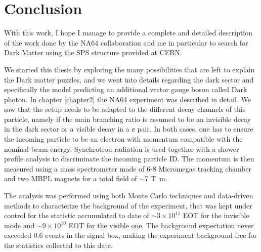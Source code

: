 
\chapter{Conclusion} %

\label{chapter6}

With this work, I hope I manage to provide a complete and detailed description of the work done by the NA64 collaboration and me in particular to search for Dark Matter using the SPS structure provided at CERN.

We started this thesis by exploring the many possibilities that are left to explain the Dark matter puzzles, and we went into details regarding the dark sector and specifically the model predicting an additional vector gauge boson called Dark photon. In chapter \ref{chapter2} the NA64 experiment was described in detail. We saw that the setup needs to be adapted to the different decay channels of this particle, namely if the main branching ratio is assumed to be an invisible decay in the dark sector or a visible decay in a $\ee$ pair. In both cases, one has to ensure the incoming particle to be an electron with momentum compatible with the nominal beam energy. Synchrotron radiation is used together with a shower profile analysis to discriminate the incoming particle ID. The momentum is then measured using a mass spectrometer made of 6-8 Micromegas tracking chamber and two MBPL magnets for a total field of $\sim$7 \si{\tesla\meter}.

The analysis was performed using both Monte Carlo techniques and data-driven methods to characterize the background of the experiment, that was kept under control for the statistic accumulated to date of $\sim 3 \times 10^{11}$ EOT for the invisible mode and $\sim 9 \times 10^{10}$ EOT for the visible one. The background expectation never exceeded 0.6 events in the signal box, making the experiment background free for the statistics collected to this date.

